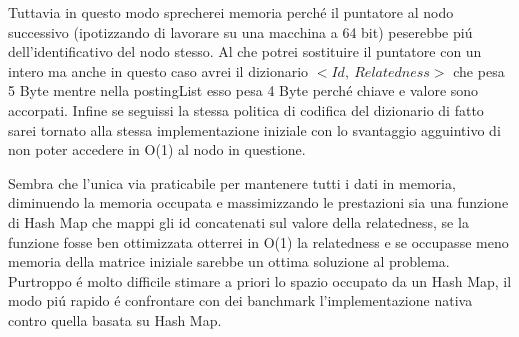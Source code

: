 Tuttavia in questo modo sprecherei memoria perch\'e il puntatore al nodo successivo (ipotizzando di lavorare su una macchina a 64 bit) peserebbe pi\'u dell'identificativo 
del nodo stesso. Al che potrei sostituire il puntatore con un intero ma anche in questo caso avrei il dizionario $< Id,\ Relatedness >$ che pesa 5 Byte mentre nella 
postingList esso pesa 4 Byte perch\'e chiave e valore sono accorpati. Infine se seguissi la stessa politica di codifica del dizionario di fatto sarei tornato alla 
stessa implementazione iniziale con lo svantaggio agguintivo di non poter accedere in O(1) al nodo in questione. 

Sembra che l'unica via praticabile per mantenere tutti i dati in memoria, diminuendo la memoria occupata e massimizzando le prestazioni sia una funzione di Hash Map 
che mappi gli id concatenati sul valore della relatedness, se la funzione fosse ben ottimizzata otterrei in O(1) la relatedness 
e se occupasse meno memoria della matrice iniziale sarebbe un ottima soluzione al problema. Purtroppo \'e molto difficile stimare a priori lo spazio occupato 
da un Hash Map, il modo pi\'u rapido \'e confrontare con dei banchmark l'implementazione nativa contro quella basata su Hash Map.
